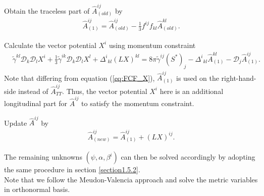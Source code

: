\begin{Step}
    \item Obtain the traceless part of $\hat{A}^{ij}_{(old)}$ by
    \begin{align}
        \hat{A}^{ij}_{(1)} = \hat{A}^{ij}_{(old)} - \frac{1}{3} f^{ij} f_{kl} \hat{A}^{kl}_{(old)}.
    \end{align}
    \item Calculate the vector potential $X^i$ using momentum constraint
    \begin{align} \label{eq:FCF_X_2}
    &\tilde{\gamma}^{kl} \mathcal{D}_k \mathcal{D}_l X^i + \frac{1}{3}\tilde{\gamma}^{ik}\mathcal{D}_k \mathcal{D}_l X^l
    + \Delta^i{}_{kl} \left( LX \right)^{kl} = 8\pi \tilde{\gamma}^{ij} \left( S^* \right)_j 
    - \Delta^i{}_{kl} \hat{A}^{kl}_{(1)} - \mathcal{D}_j \hat{A}^{ij}_{(1)}.
    \end{align}
    Note that differing from equation (\ref{eq:FCF_X}), $\hat{A}^{ij}_{(1)}$ is used on the right-hand-side instead of $\hat{A}^{ij}_{TT}$.
    Thus, the vector potential $X^i$ here is an additional longitudinal part for $\hat{A}^{ij}$ to satisfy the momentum constraint.
    \item Update $\hat{A}^{ij}$ by
    \begin{align}
        \hat{A}^{ij}_{(new)} = \hat{A}^{ij}_{(1)} + \left( L X \right)^{ij}.
    \end{align}
\end{Step}
The remaining unknowns $\left(\psi, \alpha, \beta^i\right)$ can then be solved accordingly by adopting the same procedure in section \ref{section1.5.2}.\\
Note that we follow the Meudon-Valencia approach and solve the metric variables in orthonormal basis.

